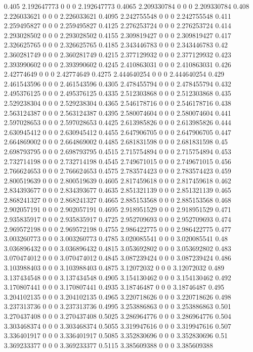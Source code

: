 {0.405 2.192647773 0 0 0 2.192647773
0.4065 2.209330784 0 0 0 2.209330784
0.408 2.226033621 0 0 0 2.226033621
0.4095 2.242755548 0 0 0 2.242755548
0.411 2.259495827 0 0 0 2.259495827
0.4125 2.276253724 0 0 0 2.276253724
0.414 2.293028502 0 0 0 2.293028502
0.4155 2.309819427 0 0 0 2.309819427
0.417 2.326625765 0 0 0 2.326625765
0.4185 2.343446783 0 0 0 2.343446783
0.42 2.360281749 0 0 0 2.360281749
0.4215 2.377129932 0 0 0 2.377129932
0.423 2.393990602 0 0 0 2.393990602
0.4245 2.410863031 0 0 0 2.410863031
0.426 2.42774649 0 0 0 2.42774649
0.4275 2.444640254 0 0 0 2.444640254
0.429 2.461543596 0 0 0 2.461543596
0.4305 2.478455794 0 0 0 2.478455794
0.432 2.495376125 0 0 0 2.495376125
0.4335 2.512303868 0 0 0 2.512303868
0.435 2.529238304 0 0 0 2.529238304
0.4365 2.546178716 0 0 0 2.546178716
0.438 2.563124387 0 0 0 2.563124387
0.4395 2.580074604 0 0 0 2.580074604
0.441 2.597028653 0 0 0 2.597028653
0.4425 2.613985826 0 0 0 2.613985826
0.444 2.630945412 0 0 0 2.630945412
0.4455 2.647906705 0 0 0 2.647906705
0.447 2.664869002 0 0 0 2.664869002
0.4485 2.681831598 0 0 0 2.681831598
0.45 2.698793795 0 0 0 2.698793795
0.4515 2.715754894 0 0 0 2.715754894
0.453 2.732714198 0 0 0 2.732714198
0.4545 2.749671015 0 0 0 2.749671015
0.456 2.766624653 0 0 0 2.766624653
0.4575 2.783574423 0 0 0 2.783574423
0.459 2.800519639 0 0 0 2.800519639
0.4605 2.817459618 0 0 0 2.817459618
0.462 2.834393677 0 0 0 2.834393677
0.4635 2.851321139 0 0 0 2.851321139
0.465 2.868241327 0 0 0 2.868241327
0.4665 2.885153568 0 0 0 2.885153568
0.468 2.902057191 0 0 0 2.902057191
0.4695 2.918951529 0 0 0 2.918951529
0.471 2.935835917 0 0 0 2.935835917
0.4725 2.952709693 0 0 0 2.952709693
0.474 2.969572198 0 0 0 2.969572198
0.4755 2.986422775 0 0 0 2.986422775
0.477 3.003260773 0 0 0 3.003260773
0.4785 3.020085541 0 0 0 3.020085541
0.48 3.036896432 0 0 0 3.036896432
0.4815 3.053692802 0 0 0 3.053692802
0.483 3.070474012 0 0 0 3.070474012
0.4845 3.087239424 0 0 0 3.087239424
0.486 3.103988403 0 0 0 3.103988403
0.4875 3.12072032 0 0 0 3.12072032
0.489 3.137434548 0 0 0 3.137434548
0.4905 3.154130462 0 0 0 3.154130462
0.492 3.170807441 0 0 0 3.170807441
0.4935 3.18746487 0 0 0 3.18746487
0.495 3.204102135 0 0 0 3.204102135
0.4965 3.220718626 0 0 0 3.220718626
0.498 3.237313736 0 0 0 3.237313736
0.4995 3.253886863 0 0 0 3.253886863
0.501 3.270437408 0 0 0 3.270437408
0.5025 3.286964776 0 0 0 3.286964776
0.504 3.303468374 0 0 0 3.303468374
0.5055 3.319947616 0 0 0 3.319947616
0.507 3.336401917 0 0 0 3.336401917
0.5085 3.352830696 0 0 0 3.352830696
0.51 3.369233377 0 0 0 3.369233377
0.5115 3.385609388 0 0 0 3.385609388
}
